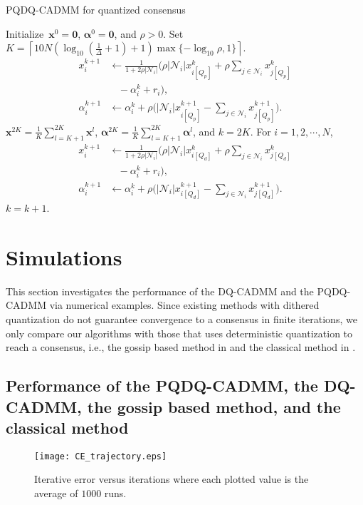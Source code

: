 \documentclass[journal]{IEEEtran}
\newcommand{\nn}{\nonumber}
\begin{document}
\begin{algorithm}[htbp]
	\caption{PQDQ-CADMM for quantized consensus}
	\begin{algorithmic}[1]\label{tab:PQDQDCADMM}
	\REQUIRE Initialize~$\bm x^0=\bm 0$, $\bm\alpha^0=\bm 0$, and $\rho>0$. Set $K=\left\lceil10N\left(\log_{10}(\frac{1}{\Delta}+1)+1\right)\max\{-\log_{10}\rho,1\}\right\rceil$.
	\STATE \begin{align} x_i^{k+1}&\gets\frac{1}{1+2\rho|\mathcal{N}_i|}\Bigg(\rho|\mathcal{N}_i|x_{i[Q_p]}^k+\rho\sum_{j\in\mathcal{N}_i} x_{j[Q_p]}^k\nn\\&~~~~-\alpha_i^k+r_i\Bigg),\nn\\
	\alpha_i^{k+1}&\gets\alpha_i^k+\rho\Bigg(|\mathcal{N}_i|x_{i[Q_p]}^{k+1}-\sum_{j\in\mathcal{N}_i} x_{j[Q_p]}^{k+1}\Bigg).\nn
	\end{align}
	\ENDFOR
	 $\bm x^{2K}=\frac{1}{K}\sum_{l=K+1}^{2K} \bm x^l$, $\bm\alpha^{2K}=\frac{1}{K}\sum_{l=K+1}^{2K} \bm\alpha^l$, and $k=2K$.
	\REPEAT
			\STATE For $i=1,2,\cdots,N$, 
			\begin{align} x_i^{k+1}&\gets\frac{1}{1+2\rho|\mathcal{N}_i|}\Bigg(\rho|\mathcal{N}_i|x_{i[Q_d]}^k+\rho\sum_{j\in\mathcal{N}_i} x_{j[Q_d]}^k\nn\\&~~~~-\alpha_i^k+r_i\Bigg),\nn\\
			\alpha_i^{k+1}&\gets\alpha_i^k+\rho\Bigg(|\mathcal{N}_i|x_{i[Q_d]}^{k+1}-\sum_{j\in\mathcal{N}_i} x_{j[Q_d]}^{k+1}\Bigg).\nn
			\end{align}
			 $k=k+1$.	
\end{algorithmic}
\end{algorithm}
\section{Simulations}
\label{sec:simulation}
This section investigates the performance of the DQ-CADMM and the PQDQ-CADMM via numerical examples. Since existing methods with dithered quantization do not guarantee convergence to a consensus in finite iterations, we only compare our algorithms with those that uses deterministic quantization to reach a consensus, i.e., the gossip based method in \cite{Carli2010} and the classical method in \cite{Nedic2009}.

\subsection{Performance of the PQDQ-CADMM, the DQ-CADMM, the gossip based method, and the classical method}
\begin{figure}[htbp]
	\centering
	\texttt{[image: CE\_trajectory.eps]}\caption{Iterative error versus iterations where each plotted value is the average of $1000$ runs.}
	\label{fig:CEtra}
\end{figure}
  
\end{document}
